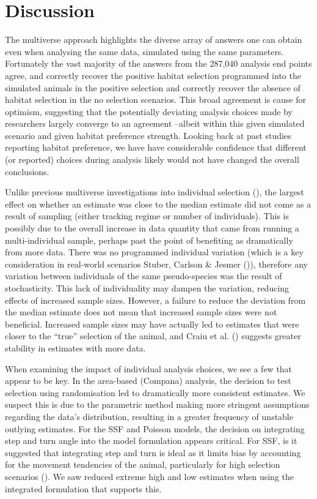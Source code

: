 \documentclass[10pt,a4paper]{article}
\begin{document}
\section{Discussion}\label{discussion}

The multiverse approach highlights the diverse array of answers one can obtain even when analysing the same data, simulated using the same parameters.
Fortunately the vast majority of the answers from the 287,040 analysis end points agree, and correctly recover the positive habitat selection programmed into the simulated animals in the positive selection and correctly recover the absence of habitat selection in the no selection scenarios.
This broad agreement is cause for optimism, suggesting that the potentially deviating analysis choices made by researchers largely converge to an agreement --albeit within this given simulated scenario and given habitat preference strength.
Looking back at past studies reporting habitat preference, we have have considerable confidence that different (or reported) choices during analysis likely would not have changed the overall conclusions.

Unlike previous multiverse investigations into individual selection (), the largest effect on whether an estimate was close to the median estimate did not come as a result of sampling (either tracking regime or number of individuals).
This is possibly due to the overall increase in data quantity that came from running a multi-individual sample, perhaps past the point of benefiting as dramatically from more data.
There was no programmed individual variation (which is a key consideration in real-world scenarios Stuber, Carlson \& Jesmer ()), therefore any variation between individuals of the same pseudo-species was the result of stochasticity.
This lack of individuality may dampen the variation, reducing effects of increased sample sizes.
However, a failure to reduce the deviation from the median estimate does not mean that increased sample sizes were not beneficial.
Increased sample sizes may have actually led to estimates that were closer to the ``true'' selection of the animal, and Craiu et al. () suggests greater stability in estimates with more data.

When examining the impact of individual analysis choices, we see a few that appear to be key.
In the area-based (Compana) analysis, the decision to test selection using randomisation led to dramatically more consistent estimates.
We suspect this is due to the parametric method making more stringent assumptions regarding the data's distribution, resulting in a greater frequency of unstable outlying estimates.
For the SSF and Poisson models, the decision on integrating step and turn angle into the model formulation appears critical.
For SSF, is it suggested that integrating step and turn is ideal as it limits bias by accounting for the movement tendencies of the animal, particularly for high selection scenarios ().
We saw reduced extreme high and low estimates when using the integrated formulation that supports this.
\end{document}
